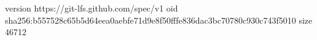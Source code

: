 version https://git-lfs.github.com/spec/v1
oid sha256:b557528c65b5d64eea0aebfe71d9e8f50fffe836dac3bc70780c930c743f5010
size 46712
